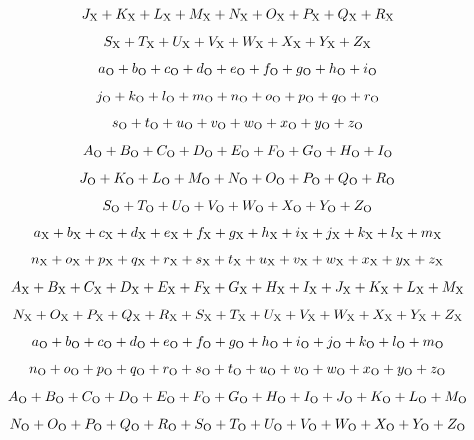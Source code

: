 $$
J_{\rm X}+
K_{\rm X}+
L_{\rm X}+
M_{\rm X}+
N_{\rm X}+
O_{\rm X}+
P_{\rm X}+
Q_{\rm X}+
R_{\rm X}
$$

$$
S_{\rm X}+
T_{\rm X}+
U_{\rm X}+
V_{\rm X}+
W_{\rm X}+
X_{\rm X}+
Y_{\rm X}+
Z_{\rm X}
$$


$$
a_{\rm O}+
b_{\rm O}+
c_{\rm O}+
d_{\rm O}+
e_{\rm O}+
f_{\rm O}+
g_{\rm O}+
h_{\rm O}+
i_{\rm O}
$$

$$
j_{\rm O}+
k_{\rm O}+
l_{\rm O}+
m_{\rm O}+
n_{\rm O}+
o_{\rm O}+
p_{\rm O}+
q_{\rm O}+
r_{\rm O}
$$

$$
s_{\rm O}+
t_{\rm O}+
u_{\rm O}+
v_{\rm O}+
w_{\rm O}+
x_{\rm O}+
y_{\rm O}+
z_{\rm O}
$$

$$
A_{\rm O}+
B_{\rm O}+
C_{\rm O}+
D_{\rm O}+
E_{\rm O}+
F_{\rm O}+
G_{\rm O}+
H_{\rm O}+
I_{\rm O}
$$

$$
J_{\rm O}+
K_{\rm O}+
L_{\rm O}+
M_{\rm O}+
N_{\rm O}+
O_{\rm O}+
P_{\rm O}+
Q_{\rm O}+
R_{\rm O}
$$

$$
S_{\rm O}+
T_{\rm O}+
U_{\rm O}+
V_{\rm O}+
W_{\rm O}+
X_{\rm O}+
Y_{\rm O}+
Z_{\rm O}
$$



$$
a_{\rm X}+
b_{\rm X}+
c_{\rm X}+
d_{\rm X}+
e_{\rm X}+
f_{\rm X}+
g_{\rm X}+
h_{\rm X}+
i_{\rm X}+
j_{\rm X}+
k_{\rm X}+
l_{\rm X}+
m_{\rm X}
$$

$$n_{\rm X}+
o_{\rm X}+
p_{\rm X}+
q_{\rm X}+
r_{\rm X}+
s_{\rm X}+
t_{\rm X}+
u_{\rm X}+
v_{\rm X}+
w_{\rm X}+
x_{\rm X}+
y_{\rm X}+
z_{\rm X}
$$

$$
A_{\rm X}+
B_{\rm X}+
C_{\rm X}+
D_{\rm X}+
E_{\rm X}+
F_{\rm X}+
G_{\rm X}+
H_{\rm X}+
I_{\rm X}+
J_{\rm X}+
K_{\rm X}+
L_{\rm X}+
M_{\rm X}
$$

$$
N_{\rm X}+
O_{\rm X}+
P_{\rm X}+
Q_{\rm X}+
R_{\rm X}+
S_{\rm X}+
T_{\rm X}+
U_{\rm X}+
V_{\rm X}+
W_{\rm X}+
X_{\rm X}+
Y_{\rm X}+
Z_{\rm X}
$$


$$
a_{\rm O}+
b_{\rm O}+
c_{\rm O}+
d_{\rm O}+
e_{\rm O}+
f_{\rm O}+
g_{\rm O}+
h_{\rm O}+
i_{\rm O}+
j_{\rm O}+
k_{\rm O}+
l_{\rm O}+
m_{\rm O}
$$

$$
n_{\rm O}+
o_{\rm O}+
p_{\rm O}+
q_{\rm O}+
r_{\rm O}+
s_{\rm O}+
t_{\rm O}+
u_{\rm O}+
v_{\rm O}+
w_{\rm O}+
x_{\rm O}+
y_{\rm O}+
z_{\rm O}
$$

$$
A_{\rm O}+
B_{\rm O}+
C_{\rm O}+
D_{\rm O}+
E_{\rm O}+
F_{\rm O}+
G_{\rm O}+
H_{\rm O}+
I_{\rm O}+
J_{\rm O}+
K_{\rm O}+
L_{\rm O}+
M_{\rm O}
$$

$$
N_{\rm O}+
O_{\rm O}+
P_{\rm O}+
Q_{\rm O}+
R_{\rm O}+
S_{\rm O}+
T_{\rm O}+
U_{\rm O}+
V_{\rm O}+
W_{\rm O}+
X_{\rm O}+
Y_{\rm O}+
Z_{\rm O}
$$

